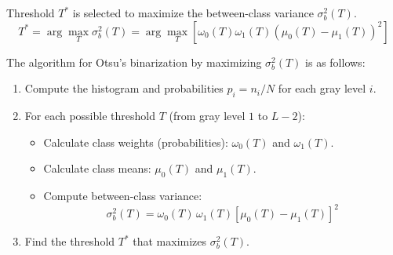 Threshold $T^*$ is selected to maximize the between-class variance $\sigma_b^2(T)$.
$$
  T^* = \arg\max_T \sigma_b^2(T) = \arg\max_T \left[ \omega_0(T) \omega_1(T) \left( \mu_0(T) - \mu_1(T) \right)^2 \right]
$$

\noindent The algorithm for Otsu's binarization by maximizing $\sigma_b^2(T)$ is as follows:

\begin{enumerate}
    \item Compute the histogram and probabilities $p_i = n_i/N$ for each gray level $i$.
    \item For each possible threshold $T$ (from gray level $1$ to $L-2$):
    \begin{itemize}
        \item Calculate class weights (probabilities): $\omega_0(T)$ and $\omega_1(T)$.
        \item Calculate class means: $\mu_0(T)$ and $\mu_1(T)$.
        \item Compute between-class variance:
            \[
            \sigma_b^2(T) = \omega_0(T)\,\omega_1(T)\left[\mu_0(T) - \mu_1(T)\right]^2
            \]
    \end{itemize}
    \item Find the threshold $T^*$ that maximizes $\sigma_b^2(T)$.
\end{enumerate}

